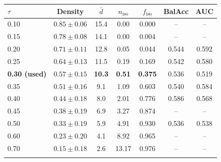 \documentclass[pdflatex,sn-basic,Numbered]{sn-jnl}
\makeatletter
\newenvironment{suptable}{\par\bigskip\noindent\begin{minipage}{\textwidth}\def\@captype{table}\centering\tablebodyfont}{\end{minipage}\par\bigskip}
\makeatother
\begin{document}
\begin{suptable}
\caption{Connectivity-threshold sensitivity (Sections~2.4 and~3.6). Graph structure pooled over the 3{,}850 windows (density = fraction of the 171 pairs retained by Eq.~(2); $\bar d$ = mean degree; $n_{\mathrm{iso}}$ = electrodes with fewer than three edges per window; $f_{\mathrm{iso}}$ = fraction of windows with one). Downstream: gaze-free variant retrained at each $\tau$ (three-member ensembles, 120 epochs, 37 folds; mean per-subject ROC-AUC).}\label{tabS7}
\footnotesize
\setlength{\tabcolsep}{3pt}\begin{tabular*}{\linewidth}{@{\extracolsep{\fill}}lcccccc@{}}
\toprule
$\tau$ & Density & $\bar d$ & $n_{\mathrm{iso}}$ & $f_{\mathrm{iso}}$ & BalAcc & AUC \\
\midrule
0.10 & $0.85\pm0.06$ & 15.4 & 0.00 & 0.000 & -- & -- \\
0.15 & $0.78\pm0.08$ & 14.1 & 0.00 & 0.004 & -- & -- \\
0.20 & $0.71\pm0.11$ & 12.8 & 0.05 & 0.044 & 0.544 & 0.592 \\
0.25 & $0.64\pm0.13$ & 11.5 & 0.19 & 0.169 & 0.542 & 0.580 \\
\textbf{0.30 (used)} & $\mathbf{0.57\pm0.15}$ & \textbf{10.3} & \textbf{0.51} & \textbf{0.375} & 0.536 & 0.519 \\
0.35 & $0.51\pm0.16$ & 9.1 & 1.09 & 0.603 & 0.540 & 0.584 \\
0.40 & $0.44\pm0.18$ & 8.0 & 2.01 & 0.776 & 0.586 & 0.568 \\
0.45 & $0.38\pm0.19$ & 6.9 & 3.27 & 0.874 & -- & -- \\
0.50 & $0.33\pm0.19$ & 5.9 & 4.91 & 0.930 & 0.536 & 0.538 \\
0.60 & $0.23\pm0.20$ & 4.1 & 8.92 & 0.965 & -- & -- \\
0.70 & $0.15\pm0.18$ & 2.6 & 13.17 & 0.976 & -- & -- \\
\botrule
\end{tabular*}
\end{suptable}
\end{document}
